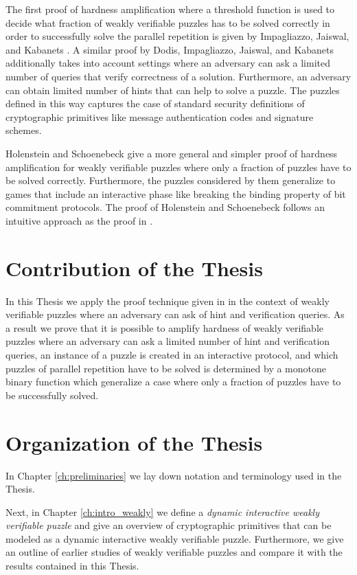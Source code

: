 \documentclass[11pt,a4paper,titlepage]{memoir}
\begin{document}
The first proof of hardness amplification where a threshold function is used to decide what fraction of weakly verifiable puzzles has to be solved correctly
in order to successfully solve the parallel repetition is given by Impagliazzo, Jaiswal, and Kabanets \cite{impagliazzo2007chernoff}.
A similar proof by Dodis, Impagliazzo, Jaiswal, and Kabanets \cite{Dodis:2009:SAI:1530441.1530450} additionally
takes into account settings where an adversary can ask a limited number of queries that verify correctness of a solution.
Furthermore, an adversary can obtain limited number of hints that can help to solve a puzzle.
The puzzles defined in this way captures the case of standard security definitions of cryptographic primitives
like message authentication codes and signature schemes.

Holenstein and Schoenebeck \cite{DBLP:journals/corr/abs-1002-3534} give a more general and simpler proof of hardness amplification
for weakly verifiable puzzles where only a fraction of puzzles have to be solved correctly.
Furthermore, the puzzles considered by them generalize to games that include an interactive
phase like breaking the binding property of bit commitment protocols.
The proof of Holenstein and Schoenebeck follows an intuitive approach as the proof in \cite{canetti2004hardness}.

\section{Contribution of the Thesis}
In this Thesis we apply the proof technique given in \cite{DBLP:journals/corr/abs-1002-3534}
in the context of weakly verifiable puzzles where an adversary can ask of hint and verification queries.
As a result we prove that it is possible to amplify hardness of weakly verifiable puzzles where an adversary
can ask a limited number of hint and verification queries, an instance of a puzzle is created in an interactive protocol,
and which puzzles of parallel repetition have to be solved is determined by a monotone binary function which generalize
a case where only a fraction of puzzles have to be successfully solved.

\section{Organization of the Thesis}
In Chapter \ref{ch:preliminaries} we lay down notation and terminology used in the Thesis.

Next, in Chapter \ref{ch:intro_weakly} we define a \textit{dynamic interactive weakly verifiable puzzle} and
give an overview of cryptographic primitives that can be modeled as
a dynamic interactive weakly verifiable puzzle. Furthermore, we give an outline of earlier studies
of weakly verifiable puzzles and compare it with the results contained in this Thesis.
\end{document}
